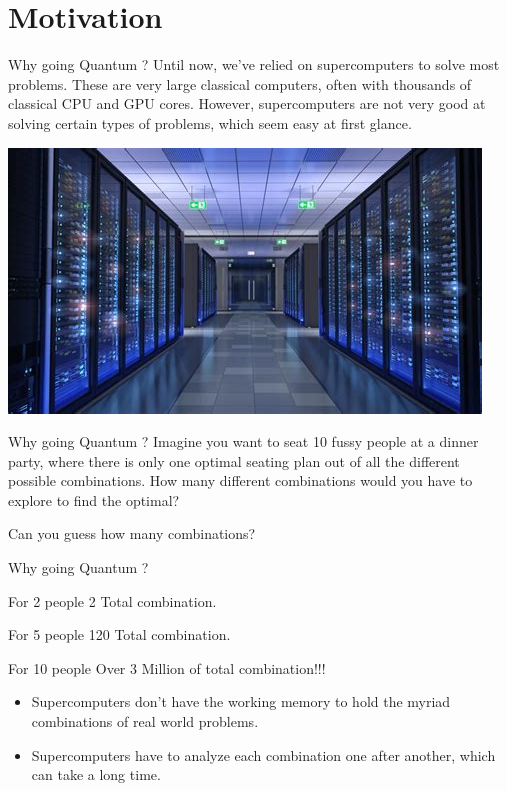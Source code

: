 \graphicspath{{assets/motivation/}}

\section[Motivation]{Motivation}

\begin{frame}{Why going Quantum ?}
	Until now, we’ve relied on supercomputers to solve most problems. These are very large classical computers, often with thousands of classical CPU and GPU cores. However, supercomputers are not very good at solving certain types of problems, which seem easy at first glance. 
	\begin{center}
	    \includegraphics[width=.7\linewidth]{supercomputer}
	\end{center}
\end{frame}

\begin{frame}{Why going Quantum ?}
Imagine you want to seat 10 fussy people at a dinner party, where there is only one optimal seating plan out of all the different possible combinations. How many different combinations would you have to explore to find the optimal?

Can you guess how many \alert{combinations}?
\end{frame}

\begin{frame}[<+- | only+>]{Why going Quantum ?}
	
	
	\begin{exampleblock}{For 2 people}
		2 Total combination.
	\end{exampleblock}
	

	\begin{block}{For 5 people}
		120 Total combination.
	\end{block}
	

	\begin{alertblock}{For 10 people}
		Over 3 Million of total combination!!!
	\end{alertblock}	
	
	\begin{itemize}
		\item Supercomputers don't have the working \alert{memory} to hold the myriad combinations of real world problems.
		\item Supercomputers have to analyze each combination one after another, which can take a long \alert{time}.
	\end{itemize}
\end{frame}

